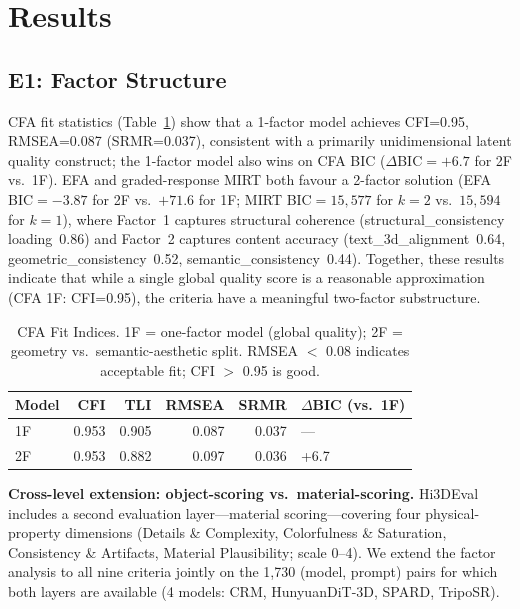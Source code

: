 \documentclass[10pt]{article}
\begin{document}
\section{Results}
\label{sec:results}

\subsection{E1: Factor Structure}
\label{sec:e1}

CFA fit statistics (Table~\ref{tab:cfa}) show that a 1-factor model achieves
CFI=0.95, RMSEA=0.087 (SRMR=0.037), consistent with a primarily
unidimensional latent quality construct; the 1-factor model also wins on CFA BIC
($\Delta$BIC$=+6.7$ for 2F vs.\ 1F).
EFA and graded-response MIRT both favour a 2-factor solution
(EFA BIC$=-3.87$ for 2F vs.\ $+71.6$ for 1F; MIRT BIC$=15{,}577$ for $k=2$
vs.\ $15{,}594$ for $k=1$), where Factor~1 captures structural coherence
(structural\_consistency loading~0.86) and Factor~2 captures content accuracy
(text\_3d\_alignment~0.64, geometric\_consistency~0.52, semantic\_consistency~0.44).
Together, these results indicate that while a single global quality score is
a reasonable approximation (CFA 1F: CFI=0.95), the criteria have a meaningful
two-factor substructure.

\begin{table}[h]
\centering
\small
\caption{CFA Fit Indices. 1F = one-factor model (global quality); 2F = geometry vs.\
semantic-aesthetic split. RMSEA $<$ 0.08 indicates acceptable fit; CFI $>$ 0.95 is good.}
\label{tab:cfa}
\begin{tabular}{lrrrrl}
\toprule
Model & CFI & TLI & RMSEA & SRMR & $\Delta$BIC (vs.\ 1F) \\
\midrule
1F & 0.953 & 0.905 & 0.087 & 0.037 & — \\
2F & 0.953 & 0.882 & 0.097 & 0.036 & +6.7 \\
\bottomrule
\end{tabular}
\end{table}

\textbf{Cross-level extension: object-scoring vs.\ material-scoring.}
Hi3DEval includes a second evaluation layer---material scoring---covering
four physical-property dimensions (Details \& Complexity, Colorfulness \&
Saturation, Consistency \& Artifacts, Material Plausibility; scale 0--4).
We extend the factor analysis to all nine criteria jointly on the 1{,}730
(model, prompt) pairs for which both layers are available (4 models: CRM,
HunyuanDiT-3D, SPARD, TripoSR).
\end{document}
